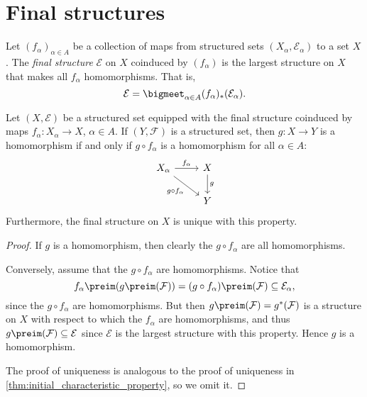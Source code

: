 \documentclass[article, a4paper, 11pt, oneside]{memoir}
\numberwithin{equation}{chapter}
\newcommand{\calE}{\mathcal{E}}
\newcommand{\calF}{\mathcal{F}}
\begin{document}
\section{Final structures}

\begin{definition}
    Let $(f_\alpha)_{\alpha \in A}$ be a collection of maps from structured sets $(X_\alpha, \calE_\alpha)$ to a set $X$. The \emph{final structure} $\calE$ on $X$ coinduced by $(f_\alpha)$ is the largest structure on $X$ that makes all $f_\alpha$ homomorphisms. That is,
    \begin{equation*}
        \calE
            = \bigmeet_{\alpha \in A} (f_\alpha)_*(\calE_\alpha).
    \end{equation*}
\end{definition}


\begin{theorem}
    Let $(X,\calE)$ be a structured set equipped with the final structure coinduced by maps $f_\alpha \colon X_\alpha \to X$,  $\alpha \in A$. If $(Y,\calF)$ is a structured set, then $g \colon X \to Y$ is a homomorphism if and only if $g \circ f_\alpha$ is a homomorphism for all $\alpha \in A$:
    \begin{equation*}
        \begin{tikzcd}
            X_\alpha
                \ar[r, "f_\alpha"]
                \ar[dr, "g \circ f_\alpha", swap]
            & X
                \ar[d, "g"] \\
            & Y
        \end{tikzcd}
    \end{equation*}
    Furthermore, the final structure on $X$ is unique with this property.
\end{theorem}

\begin{proof}
    If $g$ is a homomorphism, then clearly the $g \circ f_\alpha$ are all homomorphisms.

    Conversely, assume that the $g \circ f_\alpha$ are homomorphisms. Notice that
    \begin{equation*}
        f_\alpha\preim(g\preim(\calF))
            = (g \circ f_\alpha)\preim(\calF)
            \subseteq \calE_\alpha,
    \end{equation*}
    since the $g \circ f_\alpha$ are homomorphisms. But then $g\preim(\calF) = g^*(\calF)$ is a structure on $X$ with respect to which the $f_\alpha$ are homomorphisms, and thus $g\preim(\calF) \subseteq \calE$ since $\calE$ is the largest structure with this property. Hence $g$ is a homomorphism.

    The proof of uniqueness is analogous to the proof of uniqueness in \cref{thm:initial_characteristic_property}, so we omit it.
\end{proof}
\end{document}
